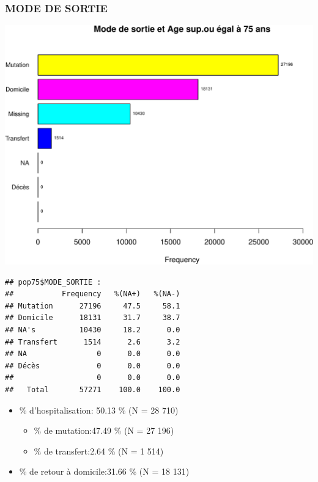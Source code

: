 \documentclass[]{article}
\begin{document}
\subsubsection{MODE DE SORTIE}\label{mode-de-sortie-1}

\includegraphics{rapport2014_V4_files/figure-latex/sortie75-1.pdf}

\begin{verbatim}
## pop75$MODE_SORTIE : 
##           Frequency   %(NA+)   %(NA-)
## Mutation      27196     47.5     58.1
## Domicile      18131     31.7     38.7
## NA's          10430     18.2      0.0
## Transfert      1514      2.6      3.2
## NA                0      0.0      0.0
## Décès             0      0.0      0.0
##                   0      0.0      0.0
##   Total       57271    100.0    100.0
\end{verbatim}

\begin{itemize}
\itemsep1pt\parskip0pt
\item
  \% d'hospitalisation: 50.13 \% (N = 28 710)

  \begin{itemize}
  \itemsep1pt\parskip0pt
  \item
    \% de mutation:47.49 \% (N = 27 196)
  \item
    \% de transfert:2.64 \% (N = 1 514)
  \end{itemize}
\item
  \% de retour à domicile:31.66 \% (N = 18 131)
\end{itemize}
\end{document}

